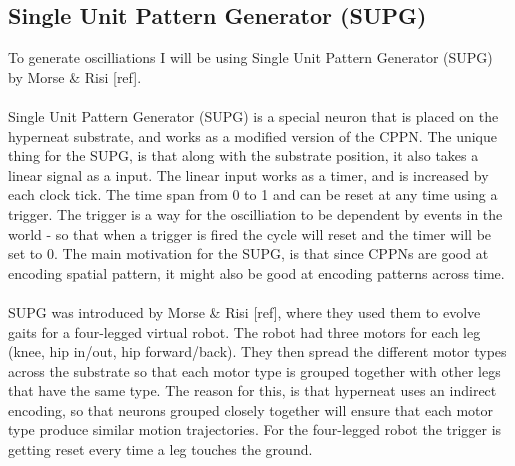 \documentclass[11pt, a4paper]{article}
\begin{document}
\subsection{Single Unit Pattern Generator (SUPG)}
To generate oscilliations I will be using Single Unit Pattern Generator (SUPG) by Morse \& Risi [ref].
\\
\\
Single Unit Pattern Generator (SUPG) is a special neuron that is placed on the hyperneat substrate, and works as a modified version of the CPPN. The unique thing for the SUPG, is that along with the substrate position, it also takes a linear signal as a input. The linear input works as a timer, and is increased by each clock tick. The time span from 0 to 1 and can be reset at any time using a trigger. The trigger is a way for the oscilliation to be dependent by events in the world - so that when a trigger is fired the cycle will reset and the timer will be set to 0. The main motivation for the SUPG, is that since CPPNs are good at encoding spatial pattern, it might also be good at encoding patterns across time.
\\
\\
SUPG was introduced by Morse \& Risi [ref], where they used them to evolve gaits for a four-legged virtual robot. The robot had three motors for each leg (knee, hip in/out, hip forward/back). They then spread the different motor types across the substrate so that each motor type is grouped together with other legs that have the same type. The reason for this, is that hyperneat uses an indirect encoding, so that neurons grouped closely together will ensure that each motor type produce similar motion trajectories. For the four-legged robot the trigger is getting reset every time a leg touches the ground.
\end{document}
